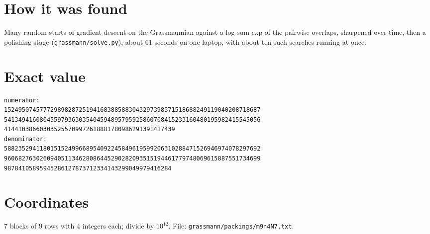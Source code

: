 \documentclass[11pt,a4paper]{article}
\begin{document}
\section{How it was found}
Many random starts of gradient descent on the Grassmannian against a log-sum-exp of the pairwise overlaps, sharpened over time, then a polishing stage (\texttt{grassmann/solve.py}); about 61 seconds on one laptop, with about ten such searches running at once.


\appendix
\section{Exact value}
{\small
\begin{verbatim}
numerator:
152495074577729898287251941683885883043297398371518688249119040208718687
541349416080455979363035404594895795925860708415233160480195982415545056
414410386603035255709972618881780986291391417439
denominator:
588235294118015152499668954092245849619599206310288471526946974078297692
960682763026094051134628086445290282093515194461779748069615887551734699
98784105895945286127873712334143299049979416284
\end{verbatim}}

\section{Coordinates}
7 blocks of 9 rows with 4 integers each; divide by $10^{12}$. File: \texttt{grassmann/packings/m9n4N7.txt}.
{\tiny
\begin{multicols}{3}
\end{multicols}}
\end{document}
